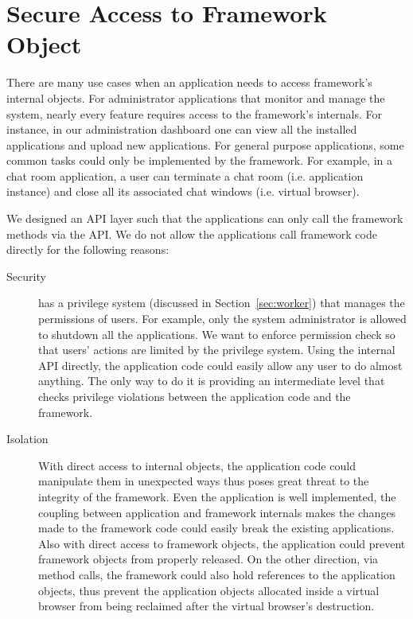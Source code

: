 \section{Secure Access to Framework Object}
\label{sec:api}

There are many use cases when an application needs to access framework's
internal objects. For administrator applications that monitor and manage the
system, nearly every feature requires access to the framework's internals. For
instance, in our administration dashboard one can view all the installed
applications and upload new applications. For general purpose applications,
some common tasks could only be implemented by the framework. For example, in
a chat room application, a user can terminate a chat room (i.e. application
instance) and close all its associated chat windows (i.e. virtual browser).

We designed an API layer such that the applications can only call the
framework methods via the API. We do not allow the applications call framework
code directly for the following reasons:

\begin{description}

\item[Security] \cb has a privilege system (discussed in
Section~\ref{sec:worker})  that manages the permissions of users. For example,
only the system administrator is allowed to shutdown all the  applications. We
want to enforce permission check so that users' actions  are limited by the
privilege system. Using the internal API directly, the application code could
easily allow any user to do almost anything. The only way to do it is
providing an intermediate level  that checks privilege violations between the
application code and the framework.

\item[Isolation] With direct access to internal objects, the application  code
could manipulate them in unexpected ways thus poses great threat to  the
integrity of the framework. Even the application is well implemented, the
coupling between application and framework internals makes the changes made to
the framework code could easily break the existing applications. Also with
direct access to framework objects, the application could prevent framework
objects from properly released. On the other direction, via method calls, the
framework could also hold references to the application objects, thus prevent
the application objects allocated inside a virtual browser from being
reclaimed after the virtual browser's destruction. 

\end{description}



